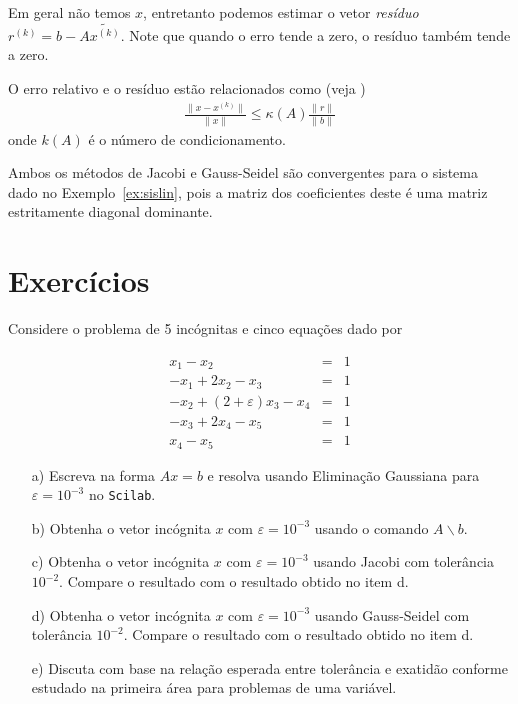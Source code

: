 Em geral não temos $x$, entretanto podemos estimar o vetor \emph{resíduo} $r^{(k)}=b-A\tilde{x^{(k)}}$. Note que quando o erro tende a zero, o resíduo também tende a zero. 

\begin{teo}
 O erro relativo e o resíduo estão relacionados como (veja \cite{Burden2013})
\begin{align}
  \frac{ \|x-x^{(k)}\|}{\|x\|} \leq  \kappa(A) \frac{\|r\|}{\|b\|}
\end{align}
onde $k(A)$ é o número de condicionamento.
\end{teo}

\begin{ex}
  Ambos os métodos de Jacobi e Gauss-Seidel são convergentes para o sistema dado no Exemplo~\ref{ex:sislin}, pois a matriz dos coeficientes deste é uma matriz estritamente diagonal dominante.
\end{ex}

\section*{Exercícios}

\begin{Exercise} Considere o problema de 5 incógnitas e cinco equações dado por

\begin{eqnarray*}
x_1-x_2&=&1\\
-x_{1}+2x_2-x_{3}&=&1\\
-x_{2}+(2+\varepsilon) x_3-x_{4}&=&1\\
-x_{3}+2x_4-x_{5}&=&1\\
x_{4}-x_{5}&=&1
\end{eqnarray*}
\begin{itemize}
\item[a)]  Escreva na forma $Ax=b$ e resolva usando Eliminação Gaussiana para $\varepsilon=10^{-3}$ no \verb+Scilab+.
\item[b)]  Obtenha o vetor incógnita $x$ com $\varepsilon=10^{-3}$ usando o comando $A\backslash b$.
\item[c)]  Obtenha o vetor incógnita $x$ com $\varepsilon=10^{-3}$ usando Jacobi com tolerância $10^{-2}$. Compare o resultado com o resultado obtido no item d.
\item[d)]  Obtenha o vetor incógnita $x$ com $\varepsilon=10^{-3}$ usando Gauss-Seidel com tolerância $10^{-2}$. Compare o resultado com o resultado obtido no item d.
\item[e)]  Discuta com base na relação esperada entre tolerância e exatidão conforme estudado na primeira área para problemas de uma variável.
\end{itemize}

\end{Exercise}

